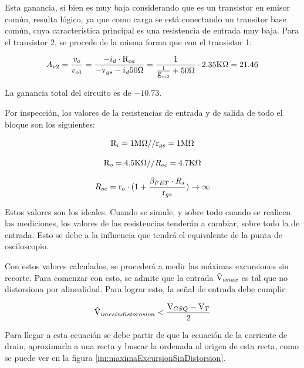 Esta ganancia, si bien es muy baja considerando que es un transistor en emisor común, resulta lógico, ya que como carga se está conectando un transitor base común, cuya característica principal es una resistencia de entrada muy baja. Para el transistor 2, se procede de la misma forma que con el transistor 1:

\begin{equation}
	A_{v2} = \frac{v_o}{v_{o1}} = \frac{- i_{d} \cdot \mbox{R}_{ca}}{- \mbox{v}_{gs} - i_{d} 50\Omega} = \frac{1}{\frac{1}{\mbox{g}_{m2}}+50\Omega} \cdot 2.35\mbox{K}\Omega = 21.46
	\label{eq:Av2}
\end{equation}

La ganancia total del circuito es de $-10.73$.

Por inspección, los valores de la resistencias de entrada y de salida de todo el bloque son los siguientes:

\begin{equation}
	\mbox{R}_{i} = 1\mbox{M}\Omega // \mbox{r}_{gs} = 1\mbox{M}\Omega 
\end{equation}

\begin{equation}
	\mbox{R}_o = 4.5\mbox{K}\Omega // R_{oc} = 4.7\mbox{K}\Omega
\end{equation}

\begin{equation}
	R_{oc} = \mbox{r}_o \cdot (1 + \frac{\beta_{FET} \cdot R_s}{\mbox{r}_{gs}}) \rightarrow \infty
\end{equation}

Estos valores son los ideales. Cuando se simule, y sobre todo cuando se realicen las mediciones, los valores de las resistencias tenderán a cambiar, sobre todo la de entrada. Esto se debe a la influencia que tendrá el equivalente de la punta de osciloscopio.

Con estos valores calculados, se procederá a medir las máximas excursiones sin recorte. Para comenzar con esto, se admite que la entrada $\hat{\mbox{V}}_{imax}$ es tal que no distorsiona por alinealidad. Para lograr esto, la señal de entrada debe cumplir:

\begin{equation}
	\hat{\mbox{V}}_{ime sin distorosion} < \frac{\mbox{V}_{GSQ} - \mbox{V}_T}{2}
	\label{eq:viSinDistorsion}
\end{equation}

Para llegar a esta ecuación se debe partir de que la ecuación de la corriente de drain, aproximarla a una recta y buscar la ordenada al origen de esta recta, como se puede ver en la figura \ref{im:maximaExcursionSinDistorsion}.

